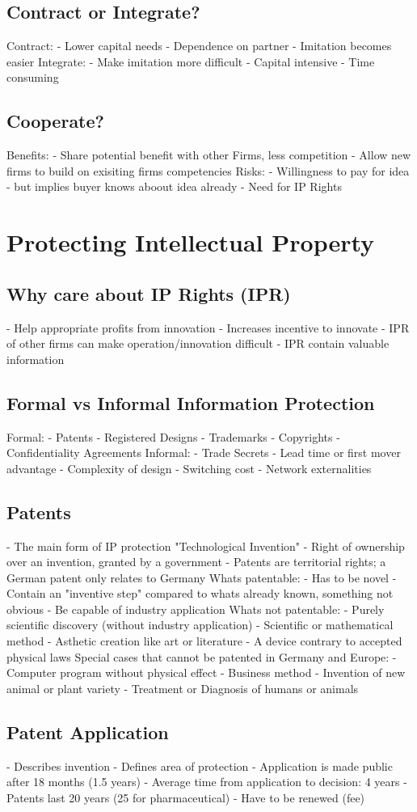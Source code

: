 \documentclass{scrartcl}
\begin{document}
\subsection*{Contract or Integrate?}
Contract:
- Lower capital needs
- Dependence on partner
- Imitation becomes easier
Integrate:
- Make imitation more difficult
- Capital intensive
- Time consuming
\subsection*{Cooperate?}
Benefits:
- Share potential benefit with other Firms, less competition
- Allow new firms to build on exisiting firms competencies
Risks:
- Willingness to pay for idea - but implies buyer knows aboout idea already
- Need for IP Rights

\section*{Protecting Intellectual Property}
\subsection*{Why care about IP Rights (IPR)}
- Help appropriate profits from innovation
- Increases incentive to innovate
- IPR of other firms can make operation/innovation difficult
- IPR contain valuable information
\subsection*{Formal vs Informal Information Protection}
Formal:
- Patents
- Registered Designs
- Trademarks
- Copyrights
- Confidentiality Agreements
Informal:
- Trade Secrets
- Lead time or first mover advantage
- Complexity of design
- Switching cost
- Network externalities
\subsection*{Patents}
- The main form of IP protection "Technological Invention"
- Right of ownership over an invention, granted by a government
- Patents are territorial rights; a German patent only relates to Germany
Whats patentable:
- Has to be novel
- Contain an "inventive step" compared to whats already known, something not obvious
- Be capable of industry application
Whats not patentable:
- Purely scientific discovery (without industry application)
- Scientific or mathematical method
- Asthetic creation like art or literature
- A device contrary to accepted physical laws
Special cases that cannot be patented in Germany and Europe:
- Computer program without physical effect
- Business method
- Invention of new animal or plant variety
- Treatment or Diagnosis of humans or animals
\subsection*{Patent Application}
- Describes invention
- Defines area of protection
- Application is made public after 18 months (1.5 years)
- Average time from application to decision: 4 years
- Patents last 20 years (25 for pharmaceutical)
- Have to be renewed (fee)
\end{document}
